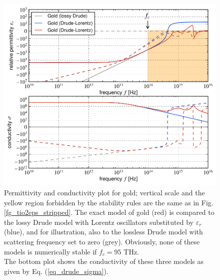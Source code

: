 \begin{figure}[t] \caption{Permittivity and conductivity plot for gold; vertical scale and the yellow region forbidden by the stability rules are the same as in Fig. \ref{fg_tio2eps_stripped}. The exact model of gold %
(red) is compared to the lossy Drude model with Lorentz oscillators substituted by $\varepsilon_r$ (blue), and for illustration, also to the lossless Drude model with scattering frequency set to zero (grey). Obviously, none of these models is numerically stable if $f_c = 95$ THz.
\\The bottom plot shows the conductivity of these three models as given by Eq. (\ref{eq_drude_sigma}).}
\label{fg_Au_models} \centering 
	\includegraphics[width=14cm]{img/epsilon_Au_models_llgrey.pdf} %
\end{figure}


